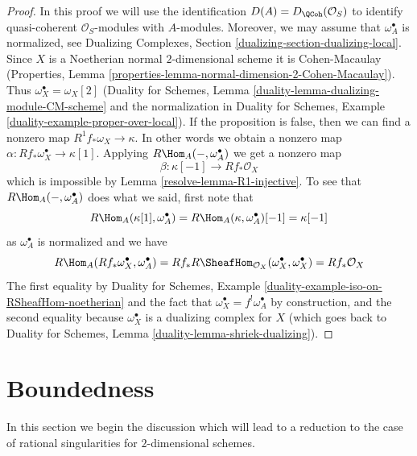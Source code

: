 \begin{proof}

In this proof we will use the identification $D(A) = D_\QCoh(\mathcal{O}_S)$
to identify quasi-coherent $\mathcal{O}_S$-modules with $A$-modules.
Moreover, we may assume that $\omega_A^\bullet$ is normalized, see
Dualizing Complexes, Section \ref{dualizing-section-dualizing-local}.
Since $X$ is a Noetherian normal $2$-dimensional scheme
it is Cohen-Macaulay (Properties, Lemma
\ref{properties-lemma-normal-dimension-2-Cohen-Macaulay}).
Thus $\omega_X^\bullet = \omega_X[2]$ (Duality for Schemes, Lemma
\ref{duality-lemma-dualizing-module-CM-scheme} and the
normalization in Duality for Schemes, Example
\ref{duality-example-proper-over-local}).
If the proposition is false, then we can find a nonzero map
$R^1f_*\omega_X \to \kappa$. In other words we obtain a nonzero map
$\alpha : Rf_*\omega_X^\bullet \to \kappa[1]$.
Applying $R\Hom_A(-, \omega_A^\bullet)$ we get a nonzero map
$$
\beta : \kappa[-1] \longrightarrow Rf_*\mathcal{O}_X
$$
which is impossible by Lemma \ref{resolve-lemma-R1-injective}.
To see that $R\Hom_A(-, \omega_A^\bullet)$ does what we said, first
note that
$$
R\Hom_A(\kappa[1], \omega_A^\bullet) =
R\Hom_A(\kappa, \omega_A^\bullet)[-1] =
\kappa[-1]
$$
as $\omega_A^\bullet$ is normalized and we have
$$
R\Hom_A(Rf_*\omega_X^\bullet, \omega_A^\bullet) =
Rf_*R\SheafHom_{\mathcal{O}_X}(\omega_X^\bullet, \omega_X^\bullet) =
Rf_*\mathcal{O}_X
$$
The first equality by
Duality for Schemes, Example \ref{duality-example-iso-on-RSheafHom-noetherian}
and the fact that $\omega_X^\bullet = f^!\omega_A^\bullet$
by construction, and the second equality because $\omega_X^\bullet$
is a dualizing complex for $X$ (which goes back to
Duality for Schemes, Lemma \ref{duality-lemma-shriek-dualizing}).
\end{proof}

\section{Boundedness}
\label{resolve-section-bounded}
In this section we begin the discussion which will lead to a reduction to
the case of rational singularities for $2$-dimensional schemes.

